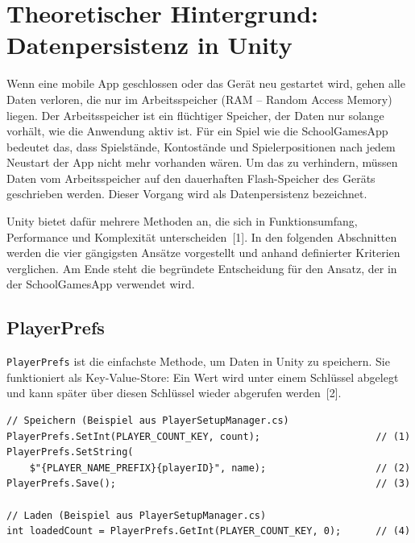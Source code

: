 \documentclass[12pt,a4paper]{article}
\begin{document}

\section{Theoretischer Hintergrund: Datenpersistenz in Unity}

Wenn eine mobile App geschlossen oder das Gerät neu gestartet wird, gehen alle Daten verloren, die nur im Arbeitsspeicher (RAM -- Random Access Memory) liegen. Der Arbeitsspeicher ist ein flüchtiger Speicher, der Daten nur solange vorhält, wie die Anwendung aktiv ist. Für ein Spiel wie die SchoolGamesApp bedeutet das, dass Spielstände, Kontostände und Spielerpositionen nach jedem Neustart der App nicht mehr vorhanden wären. Um das zu verhindern, müssen Daten vom Arbeitsspeicher auf den dauerhaften Flash-Speicher des Geräts geschrieben werden. Dieser Vorgang wird als Datenpersistenz bezeichnet.

Unity bietet dafür mehrere Methoden an, die sich in Funktionsumfang, Performance und Komplexität unterscheiden~[1]. In den folgenden Abschnitten werden die vier gängigsten Ansätze vorgestellt und anhand definierter Kriterien verglichen. Am Ende steht die begründete Entscheidung für den Ansatz, der in der SchoolGamesApp verwendet wird.

\subsection{PlayerPrefs}

\texttt{PlayerPrefs} ist die einfachste Methode, um Daten in Unity zu speichern. Sie funktioniert als Key-Value-Store: Ein Wert wird unter einem Schlüssel abgelegt und kann später über diesen Schlüssel wieder abgerufen werden~[2].

\begin{lstlisting}
// Speichern (Beispiel aus PlayerSetupManager.cs)
PlayerPrefs.SetInt(PLAYER_COUNT_KEY, count);                    // (1)
PlayerPrefs.SetString(
    $"{PLAYER_NAME_PREFIX}{playerID}", name);                   // (2)
PlayerPrefs.Save();                                             // (3)

// Laden (Beispiel aus PlayerSetupManager.cs)
int loadedCount = PlayerPrefs.GetInt(PLAYER_COUNT_KEY, 0);      // (4)
\end{lstlisting}
\end{document}
